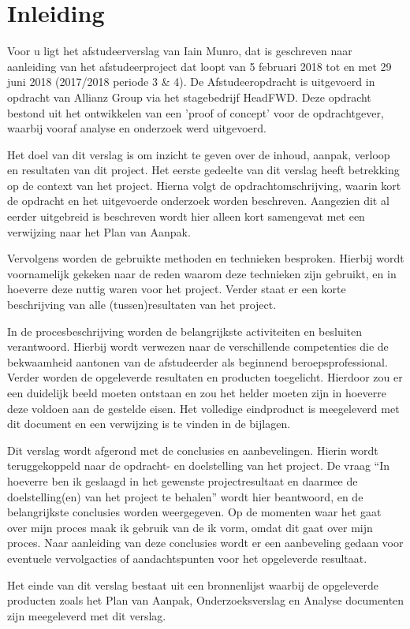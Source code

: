 \chapter{Inleiding}
Voor u ligt het afstudeerverslag van Iain Munro, dat is geschreven naar aanleiding van het afstudeerproject dat loopt van 5 februari 2018 tot en met 29 juni 2018 (2017/2018 periode 3 & 4). De Afstudeeropdracht is uitgevoerd in opdracht van Allianz Group via het stagebedrijf HeadFWD. Deze opdracht bestond uit het ontwikkelen van een ’proof of concept’ voor de opdrachtgever, waarbij vooraf analyse en onderzoek werd uitgevoerd.
\par 
Het doel van dit verslag is om inzicht te geven over de inhoud, aanpak, verloop en resultaten van dit project. Het eerste gedeelte van dit verslag heeft betrekking op de context van het project. Hierna volgt de opdrachtomschrijving, waarin kort de opdracht en het uitgevoerde onderzoek worden beschreven. Aangezien dit al eerder uitgebreid is beschreven wordt hier alleen kort samengevat met een verwijzing naar het Plan van Aanpak.
\par
Vervolgens worden de gebruikte methoden en technieken besproken. Hierbij wordt voornamelijk gekeken naar de reden waarom deze technieken zijn gebruikt, en in hoeverre deze nuttig waren voor het project. Verder staat er een korte beschrijving van alle (tussen)resultaten van het project.
\par
In de procesbeschrijving worden de belangrijkste activiteiten en besluiten verantwoord. Hierbij wordt verwezen naar de verschillende competenties die de bekwaamheid aantonen van de afstudeerder als beginnend beroepsprofessional. Verder worden de opgeleverde resultaten en producten toegelicht. Hierdoor zou er een duidelijk beeld moeten ontstaan en zou het helder moeten zijn in hoeverre deze voldoen aan de gestelde eisen. Het volledige eindproduct is meegeleverd met dit document en een verwijzing is te vinden in de bijlagen.
\par
Dit verslag wordt afgerond met de conclusies en aanbevelingen. Hierin wordt teruggekoppeld naar de opdracht- en doelstelling van het project. De vraag “In hoeverre ben ik geslaagd in het gewenste projectresultaat en daarmee de doelstelling(en) van het project te behalen” wordt hier beantwoord, en de belangrijkste conclusies worden weergegeven. Op de momenten waar het gaat over mijn proces maak ik gebruik van de ik vorm, omdat dit gaat over mijn proces. Naar aanleiding van deze conclusies wordt er een aanbeveling gedaan voor eventuele vervolgacties of aandachtspunten voor het opgeleverde resultaat.
\par
Het einde van dit verslag bestaat uit een bronnenlijst waarbij de opgeleverde producten zoals het Plan van Aanpak, Onderzoeksverslag en Analyse documenten zijn meegeleverd met dit verslag. 
